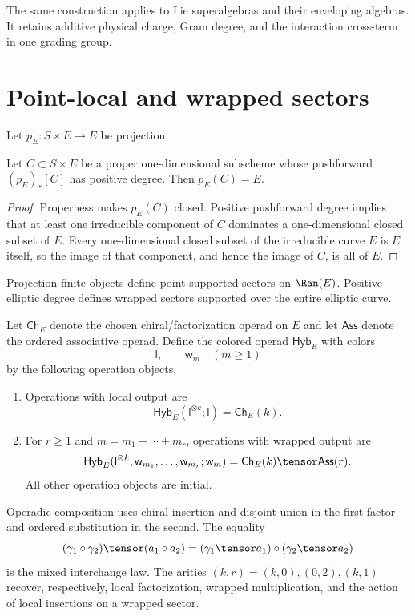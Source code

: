 The same construction applies to Lie superalgebras and their enveloping algebras. It retains additive physical charge, Gram degree, and the interaction cross-term in one grading group.

\chapter{Point-local and wrapped sectors}
Let $p_E:S\times E\to E$ be projection.

\begin{lemma}
Let $C\subset S\times E$ be a proper one-dimensional subscheme whose pushforward $(p_E)_*[C]$ has positive degree. Then $p_E(C)=E$.
\end{lemma}
\begin{proof}
Properness makes $p_E(C)$ closed. Positive pushforward degree implies that at least one irreducible component of $C$ dominates a one-dimensional closed subset of $E$. Every one-dimensional closed subset of the irreducible curve $E$ is $E$ itself, so the image of that component, and hence the image of $C$, is all of $E$.
\end{proof}

Projection-finite objects define point-supported sectors on $\Ran(E)$. Positive elliptic degree defines wrapped sectors supported over the entire elliptic curve.

\begin{definition}
Let $\mathsf{Ch}_E$ denote the chosen chiral/factorization operad on $E$ and let $\mathsf{Ass}$ denote the ordered associative operad. Define the colored operad $\mathsf{Hyb}_E$ with colors
\[
 \mathsf l,\qquad \mathsf w_m\quad(m\ge1)
\]
by the following operation objects.
\begin{enumerate}
\item Operations with local output are
\[
 \mathsf{Hyb}_E(\mathsf l^{\otimes k};\mathsf l)=\mathsf{Ch}_E(k).
\]
\item For $r\ge1$ and $m=m_1+\cdots+m_r$, operations with wrapped output are
\[
 \mathsf{Hyb}_E
 (\mathsf l^{\otimes k},\mathsf w_{m_1},\ldots,\mathsf w_{m_r};\mathsf w_m)
 =\mathsf{Ch}_E(k)\tensor\mathsf{Ass}(r).
\]
All other operation objects are initial.
\end{enumerate}
Operadic composition uses chiral insertion and disjoint union in the first factor and ordered substitution in the second. The equality
\[
 (\gamma_1\circ\gamma_2)\tensor(a_1\circ a_2)
 = (\gamma_1\tensor a_1)\circ(\gamma_2\tensor a_2)
\]
is the mixed interchange law. The arities $(k,r)=(k,0),(0,2),(k,1)$ recover, respectively, local factorization, wrapped multiplication, and the action of local insertions on a wrapped sector.
\end{definition}

